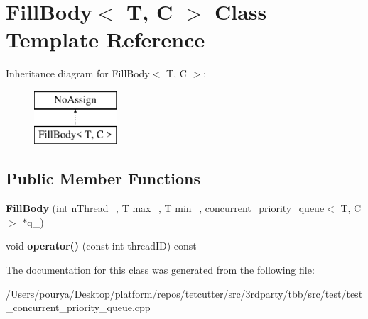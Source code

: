 \hypertarget{classFillBody}{}\section{Fill\+Body$<$ T, C $>$ Class Template Reference}
\label{classFillBody}
Inheritance diagram for Fill\+Body$<$ T, C $>$\+:\begin{figure}[H]
\begin{center}
\leavevmode
\includegraphics[height=2.000000cm]{classFillBody}
\end{center}
\end{figure}
\subsection*{Public Member Functions}
\begin{DoxyCompactItemize}
\item 
\hypertarget{classFillBody_a7e32d418e6b747e6512e277a0b2946de}{}{\bfseries Fill\+Body} (int n\+Thread\+\_\+, T max\+\_\+, T min\+\_\+, concurrent\+\_\+priority\+\_\+queue$<$ T, \hyperlink{classC}{C} $>$ $\ast$q\+\_\+)\label{classFillBody_a7e32d418e6b747e6512e277a0b2946de}

\item 
\hypertarget{classFillBody_a69e67a368a4c2b8d6d0e6876ab124c5e}{}void {\bfseries operator()} (const int thread\+I\+D) const \label{classFillBody_a69e67a368a4c2b8d6d0e6876ab124c5e}

\end{DoxyCompactItemize}


The documentation for this class was generated from the following file\+:\begin{DoxyCompactItemize}
\item 
/\+Users/pourya/\+Desktop/platform/repos/tetcutter/src/3rdparty/tbb/src/test/test\+\_\+concurrent\+\_\+priority\+\_\+queue.\+cpp\end{DoxyCompactItemize}
